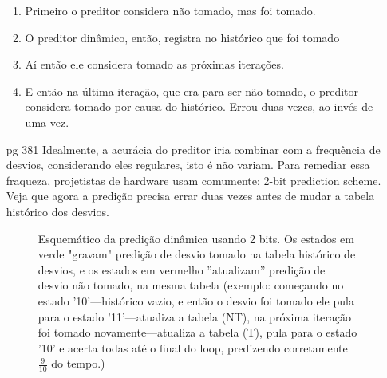 \documentclass{article}
\begin{document}
\begin{enumerate}
\begin{enumerate}
\item Primeiro o preditor considera não tomado, mas foi tomado.
\item O preditor dinâmico, então, registra no histórico que foi tomado
\item Aí então ele considera tomado as próximas iterações.
\item E então na última iteração, que era para ser não tomado, o preditor 
considera tomado por causa do histórico. Errou duas vezes, ao invés de uma vez.
\end{enumerate}

\item[pg 381] Idealmente, a acurácia do preditor iria combinar com a frequência 
de desvios, considerando eles regulares, isto é não variam. Para remediar essa 
fraqueza, projetistas de hardware usam comumente: 2-bit prediction scheme. Veja 
que agora a predição precisa errar duas vezes antes de mudar a tabela histórico 
dos desvios.

\begin{figure}[ht!]
\centering
{}
\caption{Esquemático da predição dinâmica usando 2 bits. Os estados em verde
"gravam" predição de desvio tomado na tabela histórico de desvios, e os estados
em vermelho ''atualizam'' predição de desvio não tomado, na mesma tabela
(exemplo: começando no estado '10'---histórico vazio, e então o desvio foi
tomado ele pula para o estado '11'---atualiza a tabela (NT), na próxima iteração
foi tomado novamente---atualiza a tabela (T), pula para o estado '10' e acerta
todas até o final do loop, predizendo corretamente $\frac{9}{10}$ do tempo.)}
\end{figure}


\end{enumerate}
\end{document}

